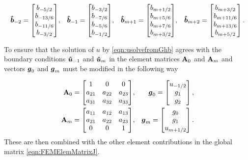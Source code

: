\begin{align*}
\boldsymbol{\hat{b}}_{-2} = \begin{bmatrix}
b_{-5/2} \\ b_{-13/6} \\ b_{-11/6} \\ b_{-3/2}\end{bmatrix}&, &\boldsymbol{\hat{b}}_{-1} = \begin{bmatrix}
b_{-3/2} \\ b_{-7/6} \\ b_{-5/6} \\ b_{-1/2}\end{bmatrix}&, &\boldsymbol{\hat{b}}_{m+1} = \begin{bmatrix}
b_{m+1/2} \\ b_{m+5/6} \\ b_{m+7/6} \\ b_{m+3/2}\end{bmatrix}&, &\boldsymbol{\hat{b}}_{m+2} = \begin{bmatrix}
b_{m+3/2} \\ b_{m+11/6} \\ b_{m+13/6} \\ b_{m+5/2}\end{bmatrix}.
\end{align*}

To ensure that the solution of $u$ by \eqref{eqn:usolvefromGhb} agrees with the boundary conditions $\boldsymbol{\hat{u}}_{-1}$ and $\boldsymbol{\hat{u}}_{m}$ in the element matrices $\mathbf{A}_0$ and $\mathbf{A}_m$ and vectors $\boldsymbol{g}_0$ and $\boldsymbol{g}_m$ must be modified in the following way 

\begin{align}
\mathbf{A}_{0} = 
\begin{bmatrix}
1 &0 &0 \\
a_{21} & a_{22} & a_{23} \\
a_{31} & a_{32} & a_{33} \\
\end{bmatrix} &,& \boldsymbol{g}_{0} = \begin{bmatrix}
u_{-1/2} \\
g_1 \\
g_2 \\
\end{bmatrix},\\
\mathbf{A}_{m} = 
\begin{bmatrix}
a_{11} & a_{12} & a_{13} \\
a_{21} & a_{22} & a_{23} \\
0 & 0 & 1 \\
\end{bmatrix} &,& \boldsymbol{g}_{m} = \begin{bmatrix}
g_0\\
g_1 \\
u_{m+1/2} \\
\end{bmatrix}.
\end{align}
These are then combined with the other element contributions in the global matrix \eqref{eqn:FEMElemMatrixJ}.

